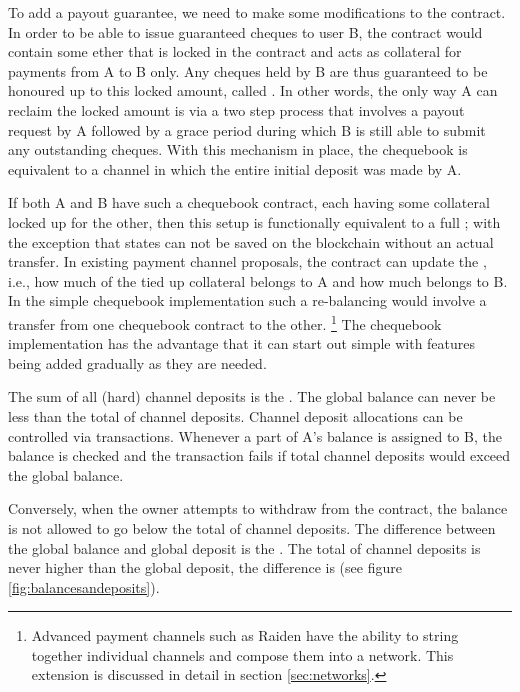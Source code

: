 To add a payout guarantee, we need to make some modifications to the contract. In order to be able to issue guaranteed cheques to user B, the contract would contain some ether that is locked in the contract and acts as collateral for payments from A to B only. Any cheques held by B are thus guaranteed to be honoured up to this locked amount, called . In other words, the only way A can reclaim the locked amount is via a two step process that involves a payout request by A followed by a grace period during which B is still able to submit any outstanding cheques. With this mechanism in place, the chequebook is equivalent to a channel in which the entire initial deposit was made by A. 

If both A and B have such a chequebook contract, each having some collateral locked up for the other, then this setup is functionally equivalent to a full ; with the exception that states can not be saved on the blockchain without an actual transfer. In existing payment channel proposals, the contract can update the , i.e., how much of the tied up collateral belongs to A and how much belongs to B. In the simple chequebook implementation such a re-balancing would involve a transfer from one chequebook contract to the other.%
%
\footnote{Advanced payment channels such as Raiden \cite{citation-needed:Raiden} have the ability to string together individual channels and compose them into a network. This extension is discussed in detail in section \ref{sec:networks}.}
%
The chequebook implementation has the advantage that it can start out simple with features being added gradually as they are needed.

The sum of all (hard) channel deposits is the . The global balance can never be less than the total of channel deposits. Channel deposit allocations can be controlled via transactions. Whenever a part of A's balance is assigned to B, the balance is checked and the transaction fails if total channel deposits would exceed the global balance.

Conversely, when the owner attempts to withdraw from the contract, the balance is not allowed to go below the total of channel deposits. 
The difference between the global balance and global deposit is the . The total of channel deposits is never higher than the global deposit, the difference is  (see figure \ref{fig:balancesandeposits}).

